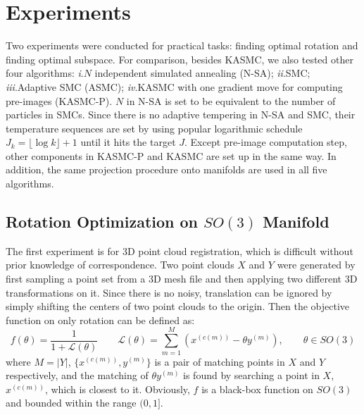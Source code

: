 \documentclass{article} %
\begin{document}
\section{Experiments}
Two experiments were conducted for practical tasks: finding optimal rotation and finding optimal subspace. For comparison, besides KASMC, we also tested 
other four algorithms: \emph{i}.$N$ independent simulated annealing (N-SA); \emph{ii}.SMC; \emph{iii}.Adaptive SMC (ASMC); \emph{iv}.KASMC with one gradient move for computing pre-images (KASMC-P). 
$N$ in N-SA is set to be equivalent to the number of particles in SMCs. Since there is no adaptive tempering in N-SA and SMC, their temperature sequences are set by using  
popular logarithmic schedule $J_k=\lfloor \log k \rfloor+1$ until it hits the target $J$. Except  pre-image computation step, other components in KASMC-P and KASMC are set up in the same way. In addition, the same projection 
procedure onto manifolds are used in all five algorithms.

\subsection{Rotation Optimization on $SO(3)$ Manifold} 
The first experiment is for 3D point cloud registration, which is difficult without prior knowledge of correspondence. 
Two point clouds $X$ and $Y$ were generated by first sampling a point set from a 3D mesh file and then applying two different 3D transformations on it. 
Since there is no noisy, translation  can be ignored by simply shifting the centers of two point clouds to the origin.     
Then the objective function on only rotation can be defined as:
\begin{equation}
	f(\theta)=\frac{1}{1+\mathcal{L}(\theta)} \quad \quad  \mathcal{L}(\theta)=\sum_{m=1}^M (x^{(c(m))}-\theta y^{(m)}), \quad \quad \theta\in SO(3)
\end{equation}
where $M=|Y|$, $\{x^{(c(m))},y^{(m)}\}$ is a pair of matching points in $X$ and $Y$ respectively, and the matching of $\theta y^{(m)}$ is found by searching a point in $X$, $x^{(c(m))}$, 
which is closest to it.  
Obviously, $f$ is a black-box function on $SO(3)$ and bounded within the range $(0,1]$. 

\end{document}
